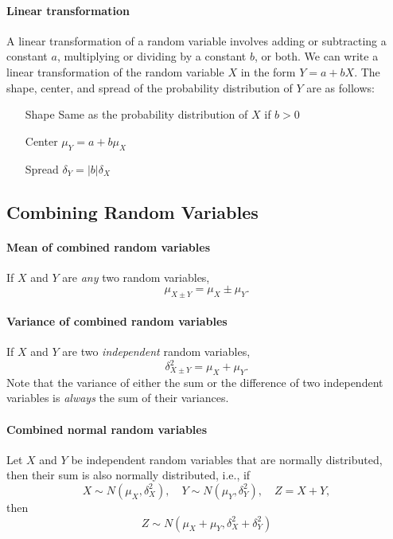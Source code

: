 \paragraph{Linear transformation} A linear transformation of a random variable involves adding or subtracting a constant $a$, multiplying or dividing by a constant $b$, or both. We can write a linear transformation of the random variable $X$ in the form $Y = a + bX$. The shape, center, and spread of the probability distribution of $Y$ are as follows:
\begin{itemize}[font=\sffamily\bfseries, leftmargin=1.95cm, style=nextline, itemsep=0cm]
\item[Shape] Same as the probability distribution of $X$ if $b > 0$
\item[Center] $\mu_Y = a + b\mu_X$
\item[Spread] $\delta_Y = |b| \delta_X$
\end{itemize}

\subsection{Combining Random Variables}

\paragraph{Mean of combined random variables} If $X$ and $Y$ are \textit{any} two random variables,
$$
    \mu_{X \pm Y} = \mu_X \pm \mu_Y.
$$

\paragraph{Variance of combined random variables} If $X$ and $Y$ are two \textit{independent} random variables,
$$
    \delta^2_{X \pm Y} = \mu_X + \mu_Y.
$$
Note that the variance of either the sum or the difference of two independent variables is \textit{always} the sum of their variances.

\paragraph{Combined normal random variables} Let $X$ and $Y$ be independent random variables that are normally distributed, then their sum is also normally distributed, i.e., if
$$
    X \sim N\left(\mu_X, \delta_X^2\right), \quad
    Y \sim N\left(\mu_Y, \delta_Y^2\right), \quad
    Z = X + Y,
$$
then
$$
    Z \sim N\left(\mu_X + \mu_Y, \delta_X^2 + \delta_Y^2\right)
$$

